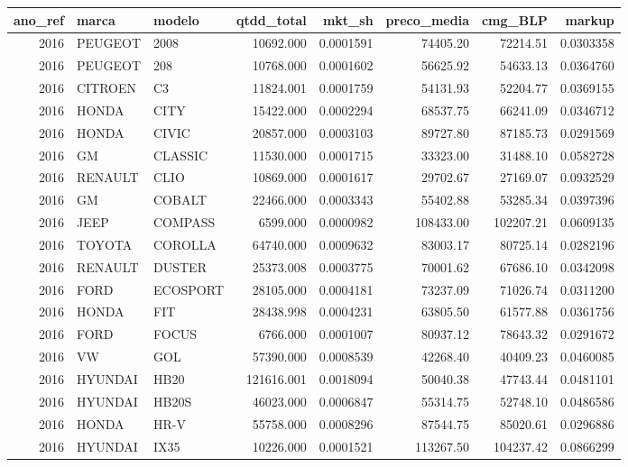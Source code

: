 \documentclass{article}
\begin{document}
\begin{table}[H]
    \centering
\begin{tabular}{r|l|l|r|r|r|r|r}
\hline
ano\_ref & marca & modelo & qtdd\_total & mkt\_sh & preco\_media & cmg\_BLP & markup\\
\hline
2016 & PEUGEOT & 2008 & 10692.000 & 0.0001591 & 74405.20 & 72214.51 & 0.0303358\\
\hline
2016 & PEUGEOT & 208 & 10768.000 & 0.0001602 & 56625.92 & 54633.13 & 0.0364760\\
\hline
2016 & CITROEN & C3 & 11824.001 & 0.0001759 & 54131.93 & 52204.77 & 0.0369155\\
\hline
2016 & HONDA & CITY & 15422.000 & 0.0002294 & 68537.75 & 66241.09 & 0.0346712\\
\hline
2016 & HONDA & CIVIC & 20857.000 & 0.0003103 & 89727.80 & 87185.73 & 0.0291569\\
\hline
2016 & GM & CLASSIC & 11530.000 & 0.0001715 & 33323.00 & 31488.10 & 0.0582728\\
\hline
2016 & RENAULT & CLIO & 10869.000 & 0.0001617 & 29702.67 & 27169.07 & 0.0932529\\
\hline
2016 & GM & COBALT & 22466.000 & 0.0003343 & 55402.88 & 53285.34 & 0.0397396\\
\hline
2016 & JEEP & COMPASS & 6599.000 & 0.0000982 & 108433.00 & 102207.21 & 0.0609135\\
\hline
2016 & TOYOTA & COROLLA & 64740.000 & 0.0009632 & 83003.17 & 80725.14 & 0.0282196\\
\hline
2016 & RENAULT & DUSTER & 25373.008 & 0.0003775 & 70001.62 & 67686.10 & 0.0342098\\
\hline
2016 & FORD & ECOSPORT & 28105.000 & 0.0004181 & 73237.09 & 71026.74 & 0.0311200\\
\hline
2016 & HONDA & FIT & 28438.998 & 0.0004231 & 63805.50 & 61577.88 & 0.0361756\\
\hline
2016 & FORD & FOCUS & 6766.000 & 0.0001007 & 80937.12 & 78643.32 & 0.0291672\\
\hline
2016 & VW & GOL & 57390.000 & 0.0008539 & 42268.40 & 40409.23 & 0.0460085\\
\hline
2016 & HYUNDAI & HB20 & 121616.001 & 0.0018094 & 50040.38 & 47743.44 & 0.0481101\\
\hline
2016 & HYUNDAI & HB20S & 46023.000 & 0.0006847 & 55314.75 & 52748.10 & 0.0486586\\
\hline
2016 & HONDA & HR-V & 55758.000 & 0.0008296 & 87544.75 & 85020.61 & 0.0296886\\
\hline
2016 & HYUNDAI & IX35 & 10226.000 & 0.0001521 & 113267.50 & 104237.42 & 0.0866299\\

\end{tabular}
\end{table}
\end{document}

